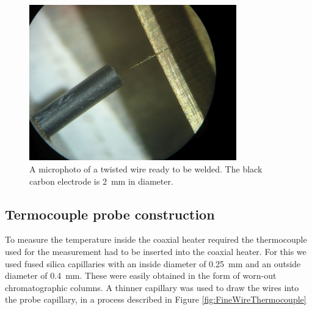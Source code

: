 \begin{figure}
	\centering
	\includegraphics[width=0.8\textwidth]{./Figures/WelderMicro.jpg}
	\decoRule
	
\caption[A microphoto of a thermocouple twist ready to be welded.]{A microphoto
of a twisted wire ready to be welded. The black carbon electrode is
\SI{2}{\milli\metre} in diameter.}
	
	\label{fig:TCWeldMicro}
\end{figure}

\subsection{Termocouple probe construction}

To measure the temperature inside the coaxial heater required the thermocouple
used for the measurement had to be inserted into the coaxial heater. For this we
used fused silica capillaries with an inside diameter of \SI{0.25}{\milli\metre}
and an outside diameter of \SI{0.4}{\milli\metre}. These were easily obtained in
the form of worn-out chromatographic columns. A thinner capillary was used to
draw the wires into the probe capillary, in a process described in Figure
\ref{fig:FineWireThermocouple}

